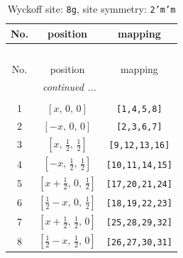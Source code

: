 \documentclass[fleqn,8pt]{jsarticle}
\begin{document}
\begin{longtable}{ccc}
\caption{Wyckoff site: {\tt 8g}, site symmetry: {\tt 2'm'm}}
 \\
 \hline \hline
No. & position & mapping \\ \hline \endfirsthead

\multicolumn{2}{l}{\tablename\ \thetable{}} \\
 \hline \hline
No. & position & mapping \\ \hline \endhead

 \hline \hline
\multicolumn{2}{r}{\footnotesize\it continued ...} \\ \endfoot

 \hline \hline
\multicolumn{2}{r}{} \\ \endlastfoot

1 & $\left[ x,\, 0,\, 0 \right]$ & {\tt [1,4,5,8]} \\ \hline
2 & $\left[ - x,\, 0,\, 0 \right]$ & {\tt [2,3,6,7]} \\ \hline
3 & $\left[ x,\, \frac{1}{2},\, \frac{1}{2} \right]$ & {\tt [9,12,13,16]} \\ \hline
4 & $\left[ - x,\, \frac{1}{2},\, \frac{1}{2} \right]$ & {\tt [10,11,14,15]} \\ \hline
5 & $\left[ x + \frac{1}{2},\, 0,\, \frac{1}{2} \right]$ & {\tt [17,20,21,24]} \\ \hline
6 & $\left[ \frac{1}{2} - x,\, 0,\, \frac{1}{2} \right]$ & {\tt [18,19,22,23]} \\ \hline
7 & $\left[ x + \frac{1}{2},\, \frac{1}{2},\, 0 \right]$ & {\tt [25,28,29,32]} \\ \hline
8 & $\left[ \frac{1}{2} - x,\, \frac{1}{2},\, 0 \right]$ & {\tt [26,27,30,31]} \\
\end{longtable}
\renewcommand{\arraystretch}{1.2}
\end{document}
